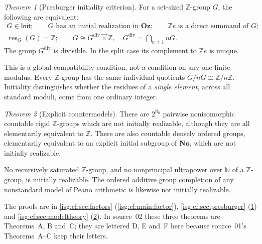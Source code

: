 \documentclass[11pt]{article}
\theoremstyle{definition}
\theoremstyle{remark}
\newtheorem{maintheorem}{Theorem}
\newcommand{\No}{\ensuremath{\mathbf{No}}}
\newcommand{\Oz}{\ensuremath{\mathbf{Oz}}}
\newcommand{\Z}{\mathbb{Z}}
\newcommand{\N}{\mathbb{N}}
\newcommand{\lex}{\mathbin{\overrightarrow{\times}}}
\newcommand{\IR}{\mathsf{Init}}
\newcommand{\res}{\operatorname{res}}
\newcommand{\dv}{\mathrm{div}}
\begin{document}
\begin{maintheorem}[Presburger initiality criterion]\label{isg:cf:main:presburger}
For a set-sized $\Z$-group $G$, the following are equivalent:
\[
\begin{gathered}
 G\in\IR;\qquad
 G\text{ has an initial realization in }\Oz;\qquad
 \Z e\text{ is a direct summand of }G;\\
 \res_G(G)=\Z;\qquad
 G\cong G^{\dv}\lex\Z,\quad G^{\dv}=\bigcap_{n\ge1}nG.
\end{gathered}
\]
The group $G^{\dv}$ is divisible. In the split case its complement to
$\Z e$ is unique.
\end{maintheorem}

This is a global compatibility condition, not a condition on any one
finite modulus. Every $\Z$-group has the same individual quotients
$G/nG\cong\Z/n\Z$. Initiality distinguishes whether the residues of a
\emph{single element}, across all standard moduli, come from one ordinary
integer.

\begin{maintheorem}[Explicit countermodels]\label{isg:cf:main:models}
There are $2^{\aleph_0}$ pairwise nonisomorphic countable rigid
$\Z$-groups which are not initially realizable, although they are all
elementarily equivalent to $\Z$. There are also countable densely
ordered groups, elementarily equivalent to an explicit initial subgroup
of $\No$, which are not initially realizable.

No recursively saturated $\Z$-group, and no nonprincipal ultrapower over
$\N$ of a $\Z$-group, is initially realizable. The ordered additive group
completion of any nonstandard model of Peano arithmetic is likewise not
initially realizable.
\end{maintheorem}

The proofs are in \cref{isg:cf:sec:factors} (\cref{isg:cf:main:factor}),
\cref{isg:cf:sec:presburger} (\cref{isg:cf:main:presburger}) and
\cref{isg:cf:sec:modeltheory} (\cref{isg:cf:main:models}). In source~02
these three theorems are Theorems~A, B and~C; they are lettered D, E
and~F here because source~01's Theorems~A--C keep their letters.
\end{document}
